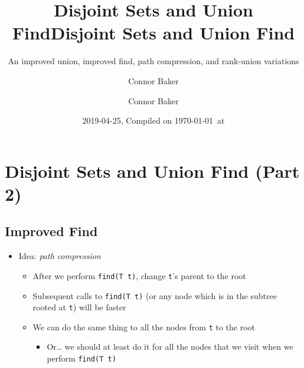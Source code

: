 \documentclass[
  10pt,
  english,
  letterpaper,
,tablecaptionabove
]{scrartcl}
\title{Disjoint Sets and Union Find}
\subtitle{An improved union, improved find, path compression, and rank-union
variations}
\author{Connor Baker}
\date{2019-04-25, Compiled on \today~at \currenttime}
\title{Disjoint Sets and Union Find}
\author{Connor Baker}
\newcommand{\passthrough}[1]{#1}
\providecommand{\tightlist}{%
  \setlength{\itemsep}{0pt}\setlength{\parskip}{0pt}}
\begin{document}

\begin{titlepage}
\afterpage{\restorepagecolor}
\newcommand{\colorRule}[3][black]{\textcolor[HTML]{#1}{\rule{#2}{#3}}}
\end{titlepage}
\restoregeometry




\hypertarget{disjoint-sets-and-union-find-part-2}{%
\section{Disjoint Sets and Union Find (Part
2)}\label{disjoint-sets-and-union-find-part-2}}

\hypertarget{improved-find}{%
\subsection{Improved Find}\label{improved-find}}

\begin{itemize}
\tightlist
\item
  Idea: \emph{path compression}

  \begin{itemize}
  \tightlist
  \item
    After we perform \passthrough{\lstinline!find(T t)!}, change
    \passthrough{\lstinline!t!}'s parent to the root
  \item
    Subsequent calls to \passthrough{\lstinline!find(T t)!} (or any node
    which is in the subtree rooted at \passthrough{\lstinline!t!}) will
    be faster
  \item
    We can do the same thing to all the nodes from
    \passthrough{\lstinline!t!} to the root

    \begin{itemize}
    \tightlist
    \item
      Or\ldots{} we should at least do it for all the nodes that we
      visit when we perform \passthrough{\lstinline!find(T t)!}
    \end{itemize}
  \end{itemize}
\end{itemize}
\end{document}
